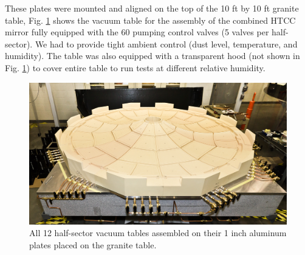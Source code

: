 These plates were mounted and aligned on the top of the 10 ft by 10 ft granite table, Fig. \ref{fig:Twelve_Foam_Vacuum_Tables} shows the vacuum table for the assembly of the combined HTCC mirror fully equipped with the 60 pumping control valves (5 valves per half-sector). We had to provide tight ambient control (dust level, temperature, and humidity). The table was also equipped with a transparent hood (not shown in Fig. \ref{fig:Twelve_Foam_Vacuum_Tables}) to cover entire table to run tests at different relative humidity.   

\begin{figure}[ht]
    \centering
    \includegraphics[width=1.0\linewidth]{images/Twelve_Foam_Vacuum_Tables.jpg}
    \caption{All 12 half-sector vacuum tables assembled on their 1 inch aluminum plates placed on the granite table.}
    \label{fig:Twelve_Foam_Vacuum_Tables}
\end{figure}

